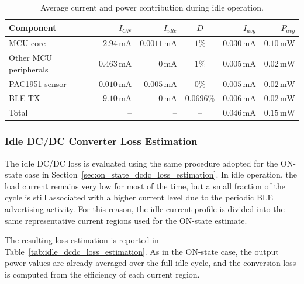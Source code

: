 \begin{table}[H]
	\centering
	\small
	\setlength{\tabcolsep}{9pt}
	\caption{Average current and power contribution during idle operation.}
	\label{tab:idle_component_consumption}
	\begin{tabular}{@{}l r r c r r@{}}
		\toprule
		\textbf{Component} & \textbf{\(I_{ON}\)} & \textbf{\(I_{idle}\)} & \textbf{\(D\)} & \textbf{\(I_{avg}\)} & \textbf{\(P_{avg}\)} \\
		\midrule
		MCU core &
		\(2.94\,\mathrm{mA}\) &
		\(0.0011\,\mathrm{mA}\) &
		\(1\%\) &
		\(0.030\,\mathrm{mA}\) &
		\(0.10\,\mathrm{mW}\) \\
		
		Other MCU peripherals &
		\(0.463\,\mathrm{mA}\) &
		\(0\,\mathrm{mA}\) &
		\(1\%\) &
		\(0.005\,\mathrm{mA}\) &
		\(0.02\,\mathrm{mW}\) \\
		
		PAC1951 sensor &
		\(0.010\,\mathrm{mA}\) &
		\(0.005\,\mathrm{mA}\) &
		\(0\%\) &
		\(0.005\,\mathrm{mA}\) &
		\(0.02\,\mathrm{mW}\) \\
		
		BLE TX &
		\(9.10\,\mathrm{mA}\) &
		\(0\,\mathrm{mA}\) &
		\(0.0696\%\) &
		\(0.006\,\mathrm{mA}\) &
		\(0.02\,\mathrm{mW}\) \\
		\midrule
		Total &
		-- &
		-- &
		-- &
		\(0.046\,\mathrm{mA}\) &
		\(0.15\,\mathrm{mW}\) \\
		\bottomrule
	\end{tabular}
\end{table}


\subsubsection{Idle DC/DC Converter Loss Estimation}
\label{sec:idle_dcdc_loss_estimation}

The idle DC/DC loss is evaluated using the same procedure adopted for the ON-state case in Section~\ref{sec:on_state_dcdc_loss_estimation}. 
In idle operation, the load current remains very low for most of the time, but a small fraction of the cycle is still associated with a higher current level due to the periodic BLE advertising activity. 
For this reason, the idle current profile is divided into the same representative current regions used for the ON-state estimate.

The resulting loss estimation is reported in Table~\ref{tab:idle_dcdc_loss_estimation}. 
As in the ON-state case, the output power values are already averaged over the full idle cycle, and the conversion loss is computed from the efficiency of each current region.

